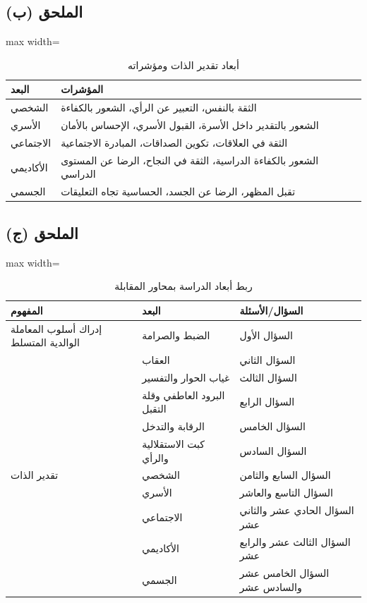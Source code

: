 \documentclass[12pt,oneside]{report}
\begin{document}
\subsection*{الملحق (ب)}
\begin{table}[H]
\centering
\caption{أبعاد تقدير الذات ومؤشراته}
\small
\renewcommand{\arraystretch}{1.3}
\setlength{\tabcolsep}{4pt}
\begin{adjustbox}{max width=\textwidth}
\begin{tabular}{p{3.8cm} p{9.6cm}}
\toprule
\textbf{البعد} & \textbf{المؤشرات} \\
\midrule
الشخصي & الثقة بالنفس، التعبير عن الرأي، الشعور بالكفاءة \\
الأسري & الشعور بالتقدير داخل الأسرة، القبول الأسري، الإحساس بالأمان \\
الاجتماعي & الثقة في العلاقات، تكوين الصداقات، المبادرة الاجتماعية \\
الأكاديمي & الشعور بالكفاءة الدراسية، الثقة في النجاح، الرضا عن المستوى الدراسي \\
الجسمي & تقبل المظهر، الرضا عن الجسد، الحساسية تجاه التعليقات \\
\bottomrule
\end{tabular}
\end{adjustbox}
\end{table}
\subsection*{الملحق (ج)}
\begin{table}[H]
\centering
\caption{ربط أبعاد الدراسة بمحاور المقابلة}
\small
\renewcommand{\arraystretch}{1.3}
\setlength{\tabcolsep}{4pt}
\begin{adjustbox}{max width=\textwidth}
\begin{tabular}{p{6cm} p{4cm} p{4cm}}
\toprule
\textbf{المفهوم} & \textbf{البعد} & \textbf{السؤال/الأسئلة} \\
\midrule
إدراك أسلوب المعاملة الوالدية المتسلط & الضبط والصرامة & السؤال الأول \\
 & العقاب & السؤال الثاني \\
 & غياب الحوار والتفسير & السؤال الثالث \\
 & البرود العاطفي وقلة التقبل & السؤال الرابع \\
 & الرقابة والتدخل & السؤال الخامس \\
 & كبت الاستقلالية والرأي & السؤال السادس \\
تقدير الذات & الشخصي & السؤال السابع والثامن \\
 & الأسري & السؤال التاسع والعاشر \\
 & الاجتماعي & السؤال الحادي عشر والثاني عشر \\
 & الأكاديمي & السؤال الثالث عشر والرابع عشر \\
 & الجسمي & السؤال الخامس عشر والسادس عشر \\
\bottomrule
\end{tabular}
\end{adjustbox}
\end{table}
\end{document}
